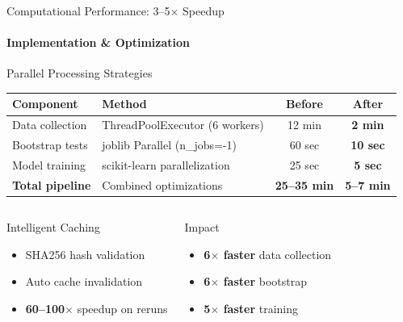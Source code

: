 \documentclass[aspectratio=169,8pt]{beamer}
\begin{document}
    \begin{frame}{Computational Performance: 3--5$\times$ Speedup}
        \framesubtitle{Implementation \& Optimization}
        \begin{block}{Parallel Processing Strategies}
        \begin{table}
            \centering
            \small
            \begin{tabular}{llcc}
                \toprule
                \textbf{Component} & \textbf{Method} & \textbf{Before} & \textbf{After} \\
                \midrule
                Data collection & ThreadPoolExecutor (6 workers) & 12 min & \textcolor{unil-blue}{\textbf{2 min}} \\
                Bootstrap tests & joblib Parallel (n\_jobs=-1) & 60 sec & \textcolor{unil-blue}{\textbf{10 sec}} \\
                Model training & scikit-learn parallelization & 25 sec & \textcolor{unil-blue}{\textbf{5 sec}} \\
                \midrule
                \textbf{Total pipeline} & Combined optimizations & \textbf{25--35 min} & \textcolor{unil-blue}{\textbf{5--7 min}} \\
                \bottomrule
            \end{tabular}
        \end{table}
        \end{block}

        \vspace{0.15cm}
        \begin{columns}[T]
            \begin{exampleblock}{Intelligent Caching}
                \begin{itemize}
                    \item SHA256 hash validation
                    \item Auto cache invalidation
                    \item \textbf{60--100$\times$} speedup on reruns
                \end{itemize}
            \end{exampleblock}

            \begin{exampleblock}{Impact}
                \begin{itemize}
                    \item \textcolor{unil-blue}{\textbf{6$\times$ faster}} data collection
                    \item \textcolor{unil-blue}{\textbf{6$\times$ faster}} bootstrap
                    \item \textcolor{unil-blue}{\textbf{5$\times$ faster}} training
                \end{itemize}
            \end{exampleblock}
        \end{columns}
    \end{frame}
\end{document}
